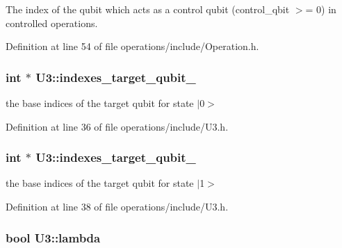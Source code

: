 The index of the qubit which acts as a control qubit (control\+\_\+qbit $>$= 0) in controlled operations. 



Definition at line 54 of file operations/include/\+Operation.\+h.

\subsubsection[{\texorpdfstring{indexes\+\_\+target\+\_\+qubit\+\_\+0}{indexes_target_qubit_0}}]{\setlength{\rightskip}{0pt plus 5cm}int $\ast$ U3\+::indexes\+\_\+target\+\_\+qubit\+\_\hspace{0.3cm}{\ttfamily [protected]}}\hypertarget{class_u3_af8f652178632c7aa4dbf191ed63d5090}{}\label{class_u3_af8f652178632c7aa4dbf191ed63d5090}


the base indices of the target qubit for state $\vert$0$>$ 



Definition at line 36 of file operations/include/\+U3.\+h.

\subsubsection[{\texorpdfstring{indexes\+\_\+target\+\_\+qubit\+\_\+1}{indexes_target_qubit_1}}]{\setlength{\rightskip}{0pt plus 5cm}int $\ast$ U3\+::indexes\+\_\+target\+\_\+qubit\+\_\hspace{0.3cm}{\ttfamily [protected]}}\hypertarget{class_u3_a786dfe52553bb9cfeac1c66fd7b76f19}{}\label{class_u3_a786dfe52553bb9cfeac1c66fd7b76f19}


the base indices of the target qubit for state $\vert$1$>$ 



Definition at line 38 of file operations/include/\+U3.\+h.

\subsubsection[{\texorpdfstring{lambda}{lambda}}]{\setlength{\rightskip}{0pt plus 5cm}bool U3\+::lambda\hspace{0.3cm}{\ttfamily [protected]}}\hypertarget{class_u3_ac7395aed7e70e30f56012effd2b21a95}{}\label{class_u3_ac7395aed7e70e30f56012effd2b21a95}


